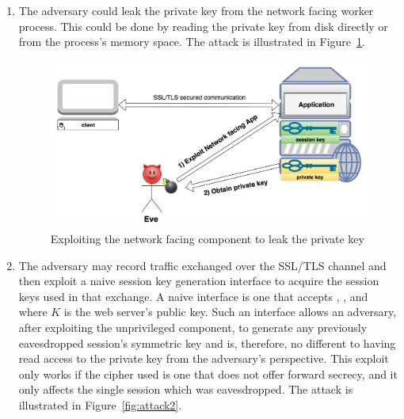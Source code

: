 \documentclass[../main.tex]{subfiles}
\begin{document}
\begin{enumerate}
  \item The adversary could leak the private key from the network
    facing worker process. This could be done by reading the private key
    from disk directly or from the process's memory space. The attack is
    illustrated in Figure~\ref{fig:attack1}.

    \begin{figure}[H] \centering
      \includegraphics[scale=0.15]{images/attack1.png}
      \caption{Exploiting the network facing component to leak the
        private key}
      \label{fig:attack1}
    \end{figure}

  \item The adversary may record traffic exchanged over the SSL/TLS
    channel and then exploit a naive session key generation interface to
    acquire the session keys used in that exchange. A naive interface is
    one that accepts \crandom, \srandom, and \premaster~ where $K$ is the
    web server's public key.  Such an interface allows an adversary, after
    exploiting the unprivileged component, to generate any previously
    eavesdropped session's symmetric key and is, therefore, no different
    to having read access to the private key from the adversary's
    perspective. This exploit only works if the cipher used is one that
    does not offer forward secrecy, and it only affects the single session
    which was eavesdropped. The attack is illustrated in
    Figure~\ref{fig:attack2}.


\end{enumerate}
\end{document}
